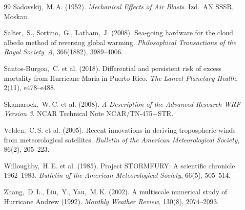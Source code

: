 ﻿\documentclass[a4paper,12pt]{article}
\theoremstyle{definition}
\begin{document}
\begin{thebibliography}{99}
Sadovskij,~M.\,A. (1952).
\textit{Mechanical Effects of Air Blasts}.
Izd.\ AN SSSR, Moskau.

Salter,~S., Sortino,~G., Latham,~J. (2008).
Sea-going hardware for the cloud albedo method of reversing
global warming.
\textit{Philosophical Transactions of the Royal Society~A},
366(1882), 3989--4006.

Santos-Burgoa,~C. et al. (2018).
Differential and persistent risk of excess mortality from
Hurricane Maria in Puerto Rico.
\textit{The Lancet Planetary Health}, 2(11), e478--e488.

Skamarock,~W.\,C. et al. (2008).
\textit{A Description of the Advanced Research WRF Version 3}.
NCAR Technical Note NCAR/TN-475+STR.

Velden,~C.\,S. et al. (2005).
Recent innovations in deriving tropospheric winds from
meteorological satellites.
\textit{Bulletin of the American Meteorological Society},
86(2), 205--223.

Willoughby,~H.\,E. et al. (1985).
Project STORMFURY: A scientific chronicle 1962--1983.
\textit{Bulletin of the American Meteorological Society},
66(5), 505--514.

Zhang,~D.\,L., Liu,~Y., Yau,~M.\,K. (2002).
A multiscale numerical study of Hurricane Andrew (1992).
\textit{Monthly Weather Review}, 130(8), 2074--2093.

\end{thebibliography}
\end{document}
